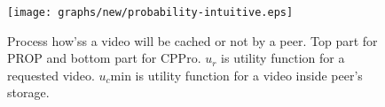\documentclass[10pt,final,journal,a4paper]{IEEEtran}
\begin{document}

\begin{figure}[!t]
\begin{center}
\texttt{[image: graphs/new/probability-intuitive.eps]}
\end{center}
\caption{Process how'ss a video will be cached or not by a peer. Top part for PROP and bottom part for CPPro. 
$u_r$ is utility function for a requested video.  
$u_c$min is utility function for a video inside peer's storage.
}
\label{fig:cached-notcached}
\end{figure} 




\end{document}
